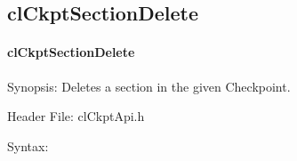\begin{flushleft}
\subsection{clCkptSectionDelete}
\hypertarget{pageckpt111}{}\paragraph{cl\-Ckpt\-Section\-Delete}\label{pageckpt111}
\begin{Desc}
\item[Synopsis:]Deletes a section in the given Checkpoint.\end{Desc}
\begin{Desc}
\item[Header File:]clCkptApi.h\end{Desc}
\begin{Desc}
\item[Syntax:]


\end{Desc}
\end{flushleft}
